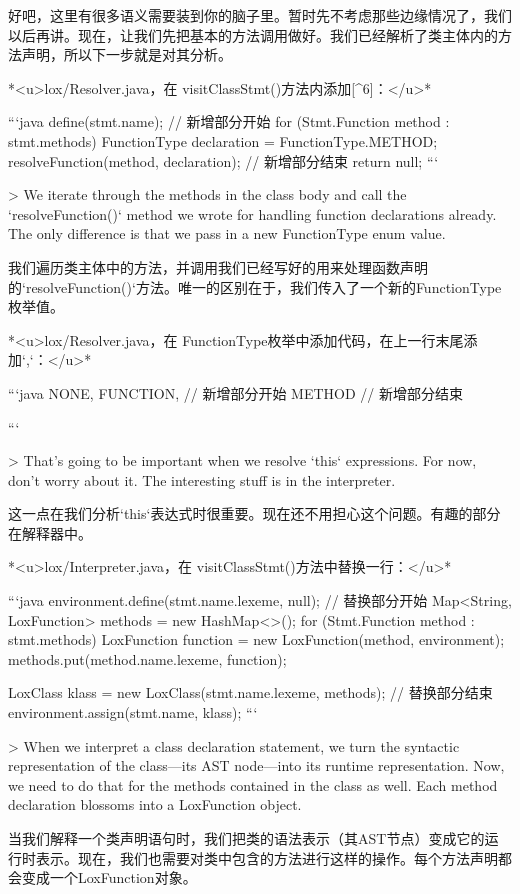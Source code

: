 \documentclass[cn,11pt,chinese]{elegantbook}
\begin{document}
{{{{{{{{{{{{{{{{{{{{好吧，这里有很多语义需要装到你的脑子里。暂时先不考虑那些边缘情况了，我们以后再讲。现在，让我们先把基本的方法调用做好。我们已经解析了类主体内的方法声明，所以下一步就是对其分析。

*<u>lox/Resolver.java，在 visitClassStmt()方法内添加[^6]：</u>*

```java
    define(stmt.name);
    // 新增部分开始
    for (Stmt.Function method : stmt.methods) {
      FunctionType declaration = FunctionType.METHOD;
      resolveFunction(method, declaration); 
    }
    // 新增部分结束
    return null;
```

> We iterate through the methods in the class body and call the `resolveFunction()` method we wrote for handling function declarations already. The only difference is that we pass in a new FunctionType enum value.

我们遍历类主体中的方法，并调用我们已经写好的用来处理函数声明的`resolveFunction()`方法。唯一的区别在于，我们传入了一个新的FunctionType枚举值。

*<u>lox/Resolver.java，在 FunctionType枚举中添加代码，在上一行末尾添加`,`：</u>*

```java
    NONE,
    FUNCTION,
    // 新增部分开始
    METHOD
    // 新增部分结束
  }
```

> That’s going to be important when we resolve `this` expressions. For now, don’t worry about it. The interesting stuff is in the interpreter.

这一点在我们分析`this`表达式时很重要。现在还不用担心这个问题。有趣的部分在解释器中。

*<u>lox/Interpreter.java，在 visitClassStmt()方法中替换一行：</u>*

```java
    environment.define(stmt.name.lexeme, null);
    // 替换部分开始
    Map<String, LoxFunction> methods = new HashMap<>();
    for (Stmt.Function method : stmt.methods) {
      LoxFunction function = new LoxFunction(method, environment);
      methods.put(method.name.lexeme, function);
    }

    LoxClass klass = new LoxClass(stmt.name.lexeme, methods);
    // 替换部分结束
    environment.assign(stmt.name, klass);
```

> When we interpret a class declaration statement, we turn the syntactic representation of the class—its AST node—into its runtime representation. Now, we need to do that for the methods contained in the class as well. Each method declaration blossoms into a LoxFunction object.

当我们解释一个类声明语句时，我们把类的语法表示（其AST节点）变成它的运行时表示。现在，我们也需要对类中包含的方法进行这样的操作。每个方法声明都会变成一个LoxFunction对象。

}}}}}}}}}}}}}}}}}}}
\end{document}

